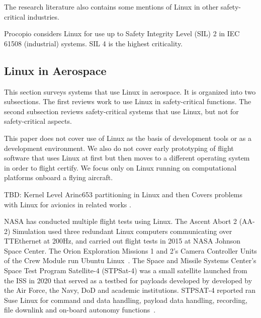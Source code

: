 The research literature also contains some mentions of Linux in other safety-critical industries.

Procopio \cite{procopio2020safety} considers Linux for use up to Safety Integrity Level (SIL) 2 in IEC 61508 (industrial) systems. SIL 4 is the highest criticality.

\subsection{Linux in Aerospace}
This section surveys systems that use Linux in aerospace. It is organized into two subsections. The first reviews  work to use Linux in safety-critical functions. The second subsection reviews safety-critical systems that use Linux, but not for safety-critical aspects.

This paper does not cover use of Linux as the basis of development tools or as a development environment. We also do not cover early prototyping of flight software that uses Linux at first but then moves to a different operating system in order to flight certify. We focus only on Linux running on computational platforms onboard a flying aircraft.

TBD:  Kernel Level Arinc653 partitioning in Linux \cite{han2012} and then Covers problems with Linux for avionics in related works \cite{bloom2020}.


NASA has conducted multiple flight tests using Linux.
%
The Ascent Abort 2 (AA-2) Simulation used three redundant Linux computers
communicating over TTEthernet at 200Hz, and carried out flight tests in 2015 at
NASA Johnson Space Center.
%
The Orion Exploration Missions 1 and 2's Camera Controller Units of the Crew Module run Ubuntu Linux~\cite{lorraine2018orion}.
%
The Space and Missile Systems Center's Space Test Program Satellite-4 (STPSat-4)
was a small satellite launched from the ISS in 2020 that served as a testbed for
payloads developed by developed by the Air Force, the Navy, DoD and academic
institutions.
%
STPSAT-4 reported ran Suse Linux for command and data handling, payload data
handling, recording, file downlink and on-board autonomy functions~\cite{prokop2015aes}.

